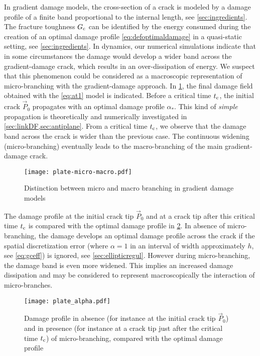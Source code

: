 In gradient damage models, the cross-section of a crack is modeled by a damage profile of a finite band proportional to the internal length, see \cref{sec:ingredients}. The fracture toughness $G_\mathrm{c}$ can be identified by the energy consumed during the creation of an optimal damage profile \eqref{eq:defoptimaldamage} in a quasi-static setting, see \cref{sec:ingredients}. In dynamics, our numerical simulations indicate that in some circumstances the damage would develop a wider band across the gradient-damage crack, which results in an over-dissipation of energy. We suspect that this phenomenon could be considered as a macroscopic representation of micro-branching with the gradient-damage approach. In \cref{fig:micro-macro}, the final damage field obtained with the \eqref{eq:at1} model is indicated. Before a critical time $t_{\mathrm{c}}$, the initial crack $\vec{P}_0$ propagates with an optimal damage profile $\alpha_*$. This kind of \emph{simple} propagation is theoretically and numerically investigated in \cref{sec:linkDF,sec:antiplane}. From a critical time $t_{\mathrm{c}}$, we observe that the damage band across the crack is wider than the previous case. The continuous widening (micro-branching) eventually leads to the macro-branching of the main gradient-damage crack. 
\begin{figure}[htbp]
\centering
\texttt{[image: plate-micro-macro.pdf]}
\caption{Distinction between micro and macro branching in gradient damage models} \label{fig:micro-macro}
\end{figure}

The damage profile at the initial crack tip $\vec{P}_0$ and at a crack tip after this critical time $t_{\mathrm{c}}$ is compared with the optimal damage profile in \cref{fig:plate_alpha}. In absence of micro-branching, the damage develops an optimal damage profile across the crack if the spatial discretization error (where $\alpha=1$ in an interval of width approximately $h$, see \eqref{eq:gceff}) is ignored, see \cref{sec:ellipticregul}. However during micro-branching, the damage band is even more widened. This implies an increased damage dissipation and may be considered to represent macroscopically the interaction of micro-branches. 
\begin{figure}[htbp]
\centering
\texttt{[image: plate\_alpha.pdf]}
\caption{Damage profile in absence (for instance at the initial crack tip $\vec{P}_0$) and in presence (for instance at a crack tip just after the critical time $t_{\mathrm{c}}$) of micro-branching, compared with the optimal damage profile} \label{fig:plate_alpha}
\end{figure}

